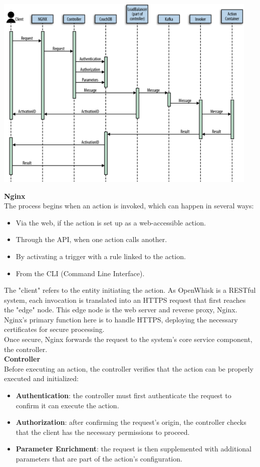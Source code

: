 \begin{center}
    \includegraphics[width=0.95\textwidth]{img/sequence.png}
    \vspace{10pt}
\end{center}
\textbf{Nginx}\\
The process begins when an action is invoked, which can happen in several ways:
\begin{itemize}
    \item Via the web, if the action is set up as a web-accessible action.
    \item Through the API, when one action calls another.
    \item By activating a trigger with a rule linked to the action.
    \item From the CLI (Command Line Interface).
\end{itemize}
The "client" refers to the entity initiating the action. As OpenWhisk is a RESTful system, each invocation is translated into an HTTPS request that first reaches the "edge" node. This edge node is the web server and reverse proxy, Nginx. Nginx’s primary function here is to handle HTTPS, deploying the necessary certificates for secure processing.\\
Once secure, Nginx forwards the request to the system's core service component, the controller.\vspace{70pt}\\
\textbf{Controller}\\
Before executing an action, the controller verifies that the action can be properly executed and initialized:
\begin{itemize}
    \item \textbf{Authentication}: the controller must first authenticate the request to confirm it can execute the action.
    \item \textbf{Authorization}: after confirming the request’s origin, the controller checks that the client has the necessary permissions to proceed.
    \item \textbf{Parameter Enrichment}: the request is then supplemented with additional parameters that are part of the action’s configuration.
\end{itemize}
